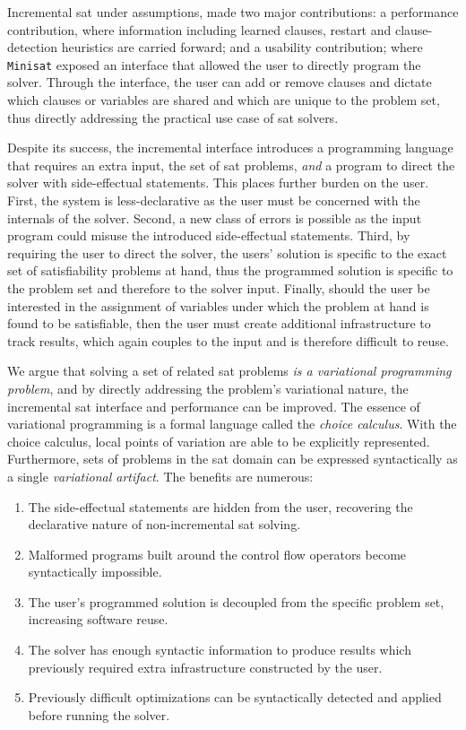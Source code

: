 Incremental \ac{sat} under assumptions, made two major contributions: a
performance contribution, where information including learned clauses, restart
and clause-detection heuristics are carried forward; and a usability
contribution; where \texttt{Minisat} exposed an interface that allowed the user
to directly program the solver. Through the interface, the user can add or
remove clauses and dictate which clauses or variables are shared and which are
unique to the problem set, thus directly addressing the practical use case of
\ac{sat} solvers.

Despite its success, the incremental interface introduces a programming language
that requires an extra input, the set of \ac{sat} problems, \emph{and} a program
to direct the solver with side-effectual statements. This places further burden
on the user. First, the system is less-declarative as the user must be concerned
with the internals of the solver. Second, a new class of errors is possible as
the input program could misuse the introduced side-effectual statements. Third,
by requiring the user to direct the solver, the users' solution is specific to
the exact set of satisfiability problems at hand, thus the programmed solution
is specific to the problem set and therefore to the solver input. Finally,
should the user be interested in the assignment of variables under which the
problem at hand is found to be satisfiable, then the user must create additional
infrastructure to track results, which again couples to the input and is
therefore difficult to reuse.

We argue that solving a set of related \ac{sat} problems \emph{is a variational
  programming problem}, and by directly addressing the problem's variational
nature, the incremental \ac{sat} interface and performance can be improved. The
essence of variational programming is a formal language called the \emph{choice
  calculus}. With the choice calculus, local points of variation are able to be
explicitly represented. Furthermore, sets of problems in the \ac{sat} domain can
be expressed syntactically as a single \emph{variational artifact}. The benefits
are numerous:
\begin{enumerate}
\item The side-effectual statements are hidden from the user, recovering the
  declarative nature of non-incremental \ac{sat} solving.
\item Malformed programs built around the control flow operators become
  syntactically impossible.
\item The user's programmed solution is decoupled from the specific problem
  set, increasing software reuse.
\item The solver has enough syntactic information to produce results which
  previously required extra infrastructure constructed by the user.
\item Previously difficult optimizations can be syntactically detected and
  applied before running the solver.
\end{enumerate}


